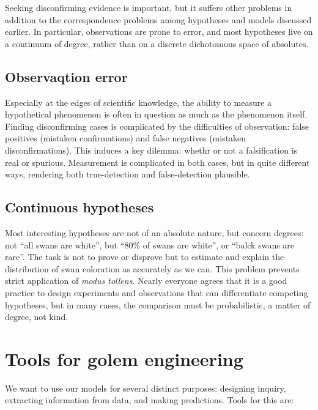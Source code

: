 \documentclass[
]{book}
\begin{document}
Seeking disconfirming evidence is important, but it suffers other problems in addition to the correspondence problems among hypotheses and models discussed earlier. In particular, observations are prone to error, and most hypotheses live on a continuum of degree, rather than on a discrete dichotomous space of absolutes.

\hypertarget{observaqtion-error}{%
\subsection{Observaqtion error}\label{observaqtion-error}}

Especially at the edges of scientific knowledge, the ability to measure a hypothetical phenomenon is often in question as much as the phenomenon itself. Finding disconfirming cases is complicated by the difficulties of observation: false positives (mistaken confirmations) and false negatives (mistaken disconfirmations). This induces a key dilemma: whethr or not a falsification is real or spurious. Measurement is complicated in both cases, but in quite different ways, rendering both true-detection and false-detection plausible.

\hypertarget{continuous-hypotheses}{%
\subsection{Continuous hypotheses}\label{continuous-hypotheses}}

Most interesting hypotheses are not of an absolute nature, but concern degrees: not ``all swans are white'', but ``80\% of swans are white'', or ``balck swans are rare''. The task is not to prove or disprove but to estimate and explain the distribution of swan coloration as accurately as we can. This problem prevents strict application of \emph{modus tollens}. Nearly everyone agrees that it is a good practice to design experiments and observations that can differentiate competing hypotheses, but in many cases, the comparison must be probabilistic, a matter of degree, not kind.

\hypertarget{tools-for-golem-engineering}{%
\section{Tools for golem engineering}\label{tools-for-golem-engineering}}

We want to use our models for several distinct purposes: designing inquiry, extracting information from data, and making predictions. Tools for this are:
\end{document}
